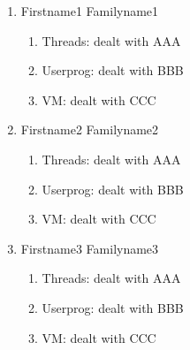 \documentclass[a4paper,12pt]{report}
\begin{document}
\begin{enumerate}
	\item Firstname1 Familyname1 
	    \begin{enumerate}
	     \item Threads: dealt with AAA
	     \item Userprog: dealt with BBB
	     \item VM: dealt with CCC
	    \end{enumerate}

	\item Firstname2 Familyname2
	    \begin{enumerate}
	     \item Threads: dealt with AAA
	     \item Userprog: dealt with BBB
	     \item VM: dealt with CCC
	    \end{enumerate}
	    
	\item Firstname3 Familyname3
	    \begin{enumerate}
	     \item Threads: dealt with AAA
	     \item Userprog: dealt with BBB
	     \item VM: dealt with CCC
	    \end{enumerate}

	   
\end{enumerate}












\setcounter{chapter}{0}%
\renewcommand\theHchapter{app.\arabic{chapter}}
\renewcommand{\thechapter}{\Alph{chapter}}%
\renewcommand{\chaptername}{\appendixname}
\part{\appendixname}





% 
\end{document}
